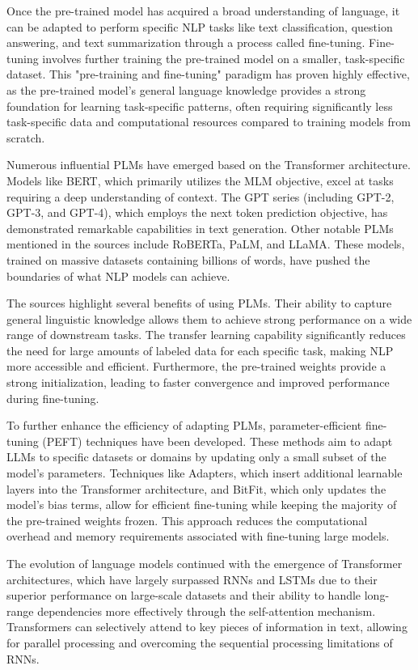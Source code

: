 Once the pre-trained model has acquired a broad understanding of language, it can be adapted to perform specific NLP tasks like text classification, question answering, and text summarization through a process called fine-tuning. Fine-tuning involves further training the pre-trained model on a smaller, task-specific dataset. This "pre-training and fine-tuning" paradigm has proven highly effective, as the pre-trained model's general language knowledge provides a strong foundation for learning task-specific patterns, often requiring significantly less task-specific data and computational resources compared to training models from scratch.

Numerous influential PLMs have emerged based on the Transformer architecture. Models like BERT, which primarily utilizes the MLM objective, excel at tasks requiring a deep understanding of context. The GPT series (including GPT-2, GPT-3, and GPT-4), which employs the next token prediction objective, has demonstrated remarkable capabilities in text generation. Other notable PLMs mentioned in the sources include RoBERTa, PaLM, and LLaMA. These models, trained on massive datasets containing billions of words, have pushed the boundaries of what NLP models can achieve.

The sources highlight several benefits of using PLMs. Their ability to capture general linguistic knowledge allows them to achieve strong performance on a wide range of downstream tasks. The transfer learning capability significantly reduces the need for large amounts of labeled data for each specific task, making NLP more accessible and efficient. Furthermore, the pre-trained weights provide a strong initialization, leading to faster convergence and improved performance during fine-tuning.

To further enhance the efficiency of adapting PLMs, parameter-efficient fine-tuning (PEFT) techniques have been developed. These methods aim to adapt LLMs to specific datasets or domains by updating only a small subset of the model's parameters. Techniques like Adapters, which insert additional learnable layers into the Transformer architecture, and BitFit, which only updates the model's bias terms, allow for efficient fine-tuning while keeping the majority of the pre-trained weights frozen. This approach reduces the computational overhead and memory requirements associated with fine-tuning large models.

The evolution of language models continued with the emergence of Transformer architectures, which have largely surpassed RNNs and LSTMs due to their superior performance on large-scale datasets and their ability to handle long-range dependencies more effectively through the self-attention mechanism. Transformers can selectively attend to key pieces of information in text, allowing for parallel processing and overcoming the sequential processing limitations of RNNs.

